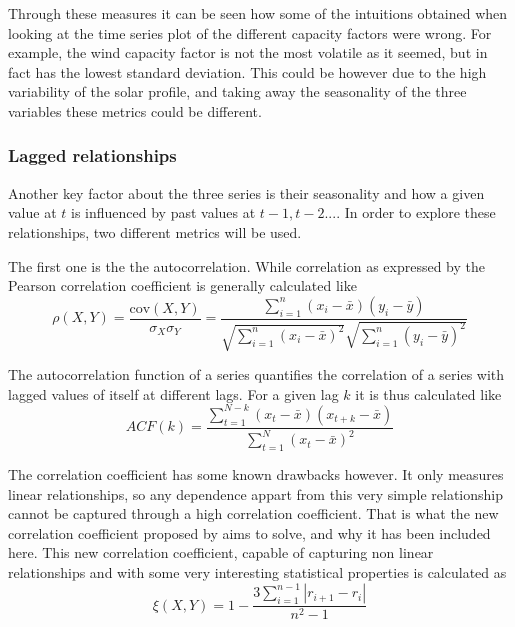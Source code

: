 Through these measures it can be seen how some of the intuitions obtained when looking at the time series plot of the different capacity factors were wrong. For example, the wind capacity factor is not the most volatile as it seemed, but in fact has the lowest standard deviation. This could be however due to the high variability of the solar profile, and taking away the seasonality of the three variables these metrics could be different.

\subsubsection{Lagged relationships}
\label{sec:lagged-relationships}
Another key factor about the three series is their seasonality and how a given value at $t$ is influenced by past values at $t-1, t-2...$. In order to explore these relationships, two different metrics will be used. 

The first one is the the autocorrelation. While correlation as expressed by the Pearson correlation coefficient is generally calculated like
\begin{equation}
    \rho{\left(X,Y\right)}=\frac{\text{cov}\left(X,Y\right)}{\sigma_X\sigma_Y}=\frac{\sum^n_{i=1}\left(x_i-\bar{x}\right)\left(y_i-\bar{y}\right)}{\sqrt{\sum^n_{i=1}\left(x_i-\bar{x}\right)^2}\sqrt{\sum^n_{i=1}\left(y_i-\bar{y}\right)^2}}
\end{equation} 

The autocorrelation function of a series quantifies the correlation of a series with lagged values of itself at different lags. For a given lag $k$ it is thus calculated like
\begin{equation}
    \label{eq:acf}
    ACF\left(k\right)=\frac{\sum^{N-k}_{t=1}\left(x_t-\bar{x}\right)\left(x_{t+k}-\bar{x}\right)}{\sum^{N}_{t=1}\left(x_t-\bar{x}\right)^2}
\end{equation} 

The correlation coefficient has some known drawbacks however. It only measures linear relationships, so any dependence appart from this very simple relationship cannot be captured through a high correlation coefficient. That is what the new correlation coefficient proposed by \cite{correlation_2021} aims to solve, and why it has been included here. This new correlation coefficient, capable of capturing non linear relationships and with some very interesting statistical properties is calculated as 
\begin{equation}
    \xi{\left(X,Y\right)}=1-\frac{3\sum_{i=1}^{n-1}\left|r_{i+1}-r_i\right|}{n^2-1}
\end{equation}

